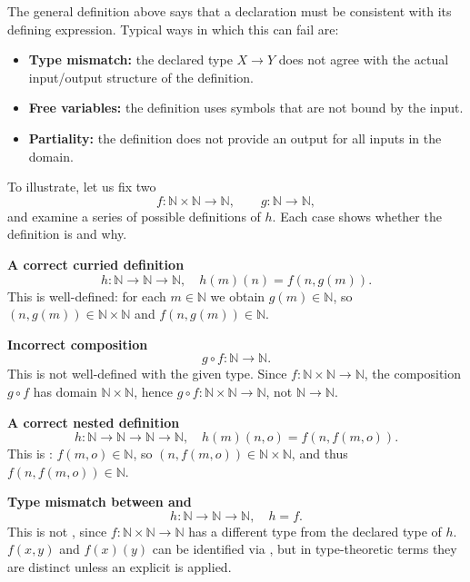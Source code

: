The general definition above says that a  declaration must be consistent with its defining expression. 
Typical ways in which this can fail are:
\begin{itemize}
  \item \textbf{Type mismatch:} the declared type $X \to Y$ does not agree with the actual input/output structure of the definition.
  \item \textbf{Free variables:} the definition uses symbols that are not bound by the input.
  \item \textbf{Partiality:} the definition does not provide an output for all inputs in the domain.
\end{itemize}

To illustrate, let us fix two 
\[
f : \mathbb{N} \times \mathbb{N} \to \mathbb{N}, 
\qquad 
g : \mathbb{N} \to \mathbb{N},
\]
and examine a series of possible definitions of  $h$. Each case shows whether the definition is  and why.

\textbf{A correct curried definition}
\[
h : \mathbb{N} \to \mathbb{N} \to \mathbb{N}, \quad h(m)(n) = f(n,g(m)).
\]
This is well-defined: for each $m \in \mathbb{N}$ we obtain $g(m) \in \mathbb{N}$, so $(n,g(m)) \in \mathbb{N}\times\mathbb{N}$ and $f(n,g(m)) \in \mathbb{N}$.

\textbf{Incorrect composition}
\[
g \circ f : \mathbb{N} \to \mathbb{N}.
\]
This is not well-defined with the given type. Since $f : \mathbb{N}\times\mathbb{N}\to \mathbb{N}$, the composition $g \circ f$ has domain $\mathbb{N}\times\mathbb{N}$, hence $g \circ f : \mathbb{N}\times\mathbb{N} \to \mathbb{N}$, not $\mathbb{N} \to \mathbb{N}$.


\textbf{A correct nested definition}
\[
h : \mathbb{N} \to \mathbb{N} \to \mathbb{N} \to \mathbb{N}, \quad h(m)(n,o) = f(n,f(m,o)).
\]
This is : $f(m,o) \in \mathbb{N}$, so $(n,f(m,o)) \in \mathbb{N}\times\mathbb{N}$, and thus $f(n,f(m,o)) \in \mathbb{N}$.

\textbf{Type mismatch between  and }
\[
h : \mathbb{N} \to \mathbb{N} \to \mathbb{N}, \quad h = f.
\]
This is not , since $f : \mathbb{N}\times\mathbb{N} \to \mathbb{N}$ has a different type from the declared type of $h$.  $f(x,y)$ and $f(x)(y)$ can be identified via , but in type-theoretic terms they are distinct unless an explicit   is applied.

